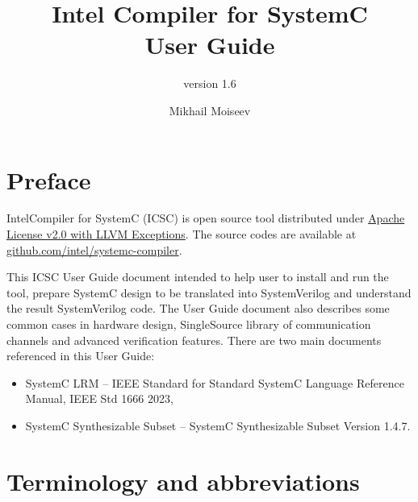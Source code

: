 



 
\title[Intel Compiler for SystemC User Guide]{Intel Compiler for SystemC \\ User Guide}
\subtitle{version 1.6}

\author{Mikhail Moiseev}
\ifdefined\INTEL
{}
\else
{}
\fi


\maketitle
\pagebreak

\setcounter{tocdepth}{2}
\tableofcontents


\pagebreak

\section{Preface}

Intel\textregistered Compiler for SystemC (ICSC) is open source tool distributed under \href{https://github.com/intel/systemc-compiler/blob/main/LICENSE.txt}{Apache License v2.0 with LLVM Exceptions}. The source codes are available at \href{https://github.com/intel/systemc-compiler}{github.com/intel/systemc-compiler}.

This ICSC User Guide document intended to help user to install and run the tool, prepare SystemC design to be translated into SystemVerilog and understand the result SystemVerilog code. The User Guide document also describes some common cases in hardware design, SingleSource library of communication channels and advanced verification features.
%
There are two main documents referenced in this User Guide: 
\begin{itemize}
\item SystemC LRM -- IEEE Standard for Standard SystemC Language Reference Manual, IEEE Std 1666 2023,
\item SystemC Synthesizable Subset -- SystemC Synthesizable Subset Version 1.4.7. 
\end{itemize}

\section{Terminology and abbreviations}

